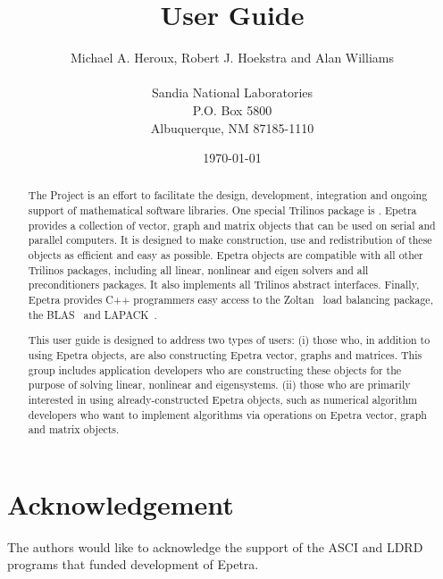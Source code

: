 \documentclass[12pt,relax]{EpetraUserGuide}
\title{\EpetraTM{} User Guide}
\author{Michael A. Heroux, Robert J. Hoekstra and Alan Williams \\
    \\
        Sandia National Laboratories\\
        P.O. Box 5800\\
        Albuquerque, NM 87185-1110
     }
\date{\today} %
\begin{document}
\maketitle

\begin{abstract}

The \TrilinosTM{} Project is an effort to facilitate the design, development,
integration and ongoing support of mathematical software libraries.
One special Trilinos package is \EpetraTM{}.  Epetra provides a collection of
vector, graph and matrix objects that can be used on serial
and parallel computers.  It is designed to make construction, use and redistribution
of these objects as efficient and easy as possible.  Epetra objects are compatible with all
other Trilinos packages, including all linear, nonlinear and eigen solvers and all
preconditioners packages.  It also implements all Trilinos abstract
interfaces.  Finally, Epetra
provides C++ programmers easy access to the Zoltan~\cite{zoltan-ug}
load balancing package, the BLAS~\cite{BLAS1,BLAS2,BLAS3} and LAPACK~\cite{lapack}.

This user guide is designed to address two types of users:
(i) those who, in addition to using Epetra
objects, are also constructing Epetra vector, graphs and matrices.  This group
includes application developers who are constructing these objects for the purpose
of solving linear, nonlinear and eigensystems.
(ii) those who
are primarily interested in using already-constructed Epetra objects, such as
numerical algorithm developers who want to implement algorithms via
operations on Epetra vector, graph and matrix objects.
\end{abstract}


\section*{Acknowledgement}
The authors would like to acknowledge the support of the ASCI and LDRD
programs that funded development of Epetra.

\clearpage
\tableofcontents
\listoffigures
\listoftables

\clearpage
\end{document}
